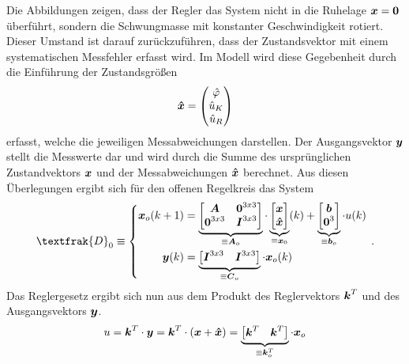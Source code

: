 Die Abbildungen zeigen, dass der Regler das System nicht in die Ruhelage $\boldsymbol{x}=\boldsymbol{0}$ überführt, sondern die Schwungmasse mit konstanter Geschwindigkeit rotiert. Dieser Umstand ist darauf zurückzuführen, dass der Zustandsvektor mit einem systematischen Messfehler erfasst wird. Im Modell wird diese Gegebenheit durch die Einführung der Zustandsgrößen
\begin{equation}
\boldsymbol{\hat{x}} = \begin{pmatrix}
\hat{\varphi} \\ \hat{u}_K \\ \hat{u}_R
\end{pmatrix}
\end{equation}
erfasst, welche die jeweiligen Messabweichungen darstellen. Der Ausgangsvektor $\boldsymbol{y}$ stellt die Messwerte dar und wird durch die Summe des ursprünglichen Zustandvektors $\boldsymbol{x}$ und der Messabweichungen $\boldsymbol{\hat{x}}$ berechnet. Aus diesen Überlegungen ergibt sich für den offenen Regelkreis das System
\begin{equation}
\textfrak{D}_0 \equiv \left\{ \begin{split}
\bs{x}_o(k+1) &= \underbrace{\begin{bmatrix}
\bs{A} & \bs{0}^{3x3} \\ \bs{0}^{3x3} & \bs{I}^{3x3}\end{bmatrix}}_{\equiv \bs{A}_o}\cdot \underbrace{\begin{bmatrix}
\bs{x} \\ \bs{\hat{x}}
\end{bmatrix}}_{\equiv \bs{x}_0}(k) + \underbrace{\begin{bmatrix}
\bs{b} \\ \bs{0}^3 \end{bmatrix}}_{\equiv \bs{b}_o} \cdot u(k)
\\
\bs{y}(k) &= \underbrace{\begin{bmatrix}
\bs{I}^{3x3} & \bs{I}^{3x3}\end{bmatrix}}_{\equiv \bs{C}_o}\cdot \bs{x}_o(k)
\end{split}
\right. \,.
\end{equation}
Das Reglergesetz ergibt sich nun aus dem Produkt des Reglervektors $\boldsymbol{k}^T$ und des Ausgangsvektors $\boldsymbol{y}$.
\begin{equation}
u = \boldsymbol{k}^T\cdot \boldsymbol{y} = \boldsymbol{k}^T \cdot (\boldsymbol{x} + \boldsymbol{\hat{x}}) = \underbrace{\begin{bmatrix}
\boldsymbol{k}^T & \boldsymbol{k}^T
\end{bmatrix}}_{\equiv \boldsymbol{k}^T_o} \cdot \boldsymbol{x}_o
\end{equation}
